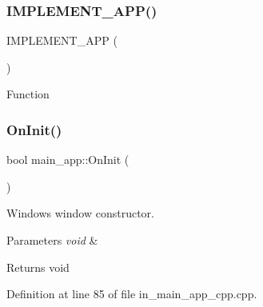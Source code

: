 \subsubsection{IMPLEMENT\_APP()}
{\footnotesize\ttfamily I\+M\+P\+L\+E\+M\+E\+N\+T\+\_\+\+A\+PP (\begin{DoxyParamCaption}\item[{\textbf{ main\+\_\+app}}]{ }\end{DoxyParamCaption})}

Function \mbox{\label{group___main_ga61b2ab06c9bf6f8d3aef0aea1b4d711a}} 
\subsubsection{OnInit()}
{\footnotesize\ttfamily bool main\+\_\+app\+::\+On\+Init (\begin{DoxyParamCaption}{ }\end{DoxyParamCaption})\hspace{0.3cm}{\ttfamily [virtual]}}



Windows window constructor. 


\begin{DoxyParams}{Parameters}
{\em void} & \\
\hline
\end{DoxyParams}
\begin{DoxyReturn}{Returns}
void 
\end{DoxyReturn}


Definition at line 85 of file in\+\_\+main\+\_\+app\+\_\+cpp.\+cpp.

